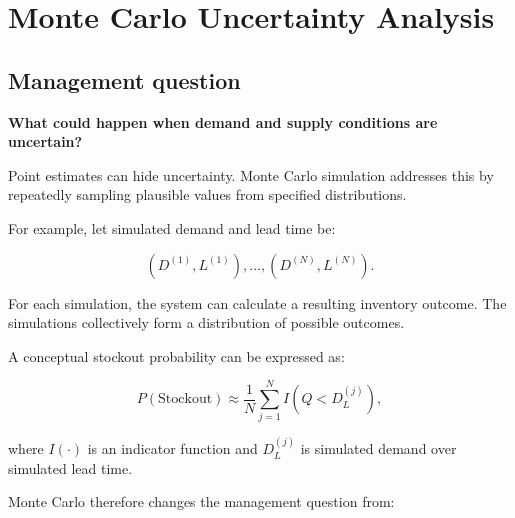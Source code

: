 \documentclass[11pt,a4paper]{article}
\begin{document}
\section{Monte Carlo Uncertainty Analysis}

\subsection{Management question}

\begin{principle}[Question]
\centering
\Large \textbf{What could happen when demand and supply conditions are uncertain?}
\end{principle}

Point estimates can hide uncertainty. Monte Carlo simulation addresses this by
repeatedly sampling plausible values from specified distributions.

For example, let simulated demand and lead time be:

\[
(D^{(1)},L^{(1)}),\ldots,(D^{(N)},L^{(N)}).
\]

For each simulation, the system can calculate a resulting inventory outcome.
The simulations collectively form a distribution of possible outcomes.

A conceptual stockout probability can be expressed as:

\[
P(\text{Stockout})
\approx
\frac{1}{N}
\sum_{j=1}^{N}
I\!\left(Q < D_{L}^{(j)}\right),
\]

where \(I(\cdot)\) is an indicator function and \(D_L^{(j)}\) is simulated
demand over simulated lead time.

\begin{center}
\end{center}

Monte Carlo therefore changes the management question from:
\end{document}
